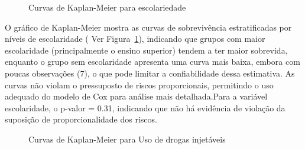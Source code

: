 \documentclass[
  letterpaper,
  DIV=11,
  numbers=noendperiod]{scrreprt}
\begin{document}
\begin{figure}

\caption{\label{fig-fig3}Curvas de Kaplan-Meier para escolariedade}


\end{figure}%

O gráfico de Kaplan-Meier mostra as curvas de sobrevivência
estratificadas por níveis de escolaridade ( Ver Figura~\ref{fig-fig3}),
indicando que grupos com maior escolaridade (principalmente o ensino
superior) tendem a ter maior sobrevida, enquanto o grupo sem
escolaridade apresenta uma curva mais baixa, embora com poucas
observações (7), o que pode limitar a confiabilidade dessa estimativa.
As curvas não violam o pressuposto de riscos proporcionais, permitindo o
uso adequado do modelo de Cox para análise mais detalhada.Para a
variável escolaridade, o p-valor = 0.31, indicando que não há evidência
de violação da suposição de proporcionalidade dos riscos.

\begin{figure}

\caption{\label{fig-fig4}Curvas de Kaplan-Meier para Uso de drogas
injetáveis}


\end{figure}%
\end{document}
